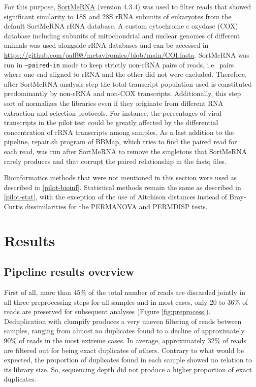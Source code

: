 \documentclass[
  openany]{book}
\begin{document}
For this purpose, \href{https://github.com/biocore/sortmerna}{SortMeRNA} \autocite{Kopylova2012} (version 4.3.4) was used to filter reads that showed significant similarity to 18S and 28S rRNA subunits of eukaryotes from the default SortMeRNA rRNA database. A custom cytochrome c oxydase (COX) database including subunits of mitochondrial and nuclear genomes of different animals was used alongside rRNA databases and can be accessed in \url{https://github.com/palf98/metaviromics/blob/main/COI.fasta}. SortMeRNA was run in \texttt{--paired-in} mode to keep strictly non-rRNA pairs of reads, i.e.~pairs where one end aligned to rRNA and the other did not were excluded. Therefore, after SortMeRNA analysis step the total transcript population used is constituted predominantly by non-rRNA and non-COX transcripts. Additionally, this step sort of normalizes the libraries even if they originate from different RNA extraction and selection protocols. For instance, the percentages of viral transcripts in the pilot test could be greatly affected by the differential concentration of rRNA transcripts among samples. As a last addition to the pipeline, repair.sh program of BBMap, which tries to find the paired read for each read, was run after SortMeRNA to remove the singletons that SortMeRNA rarely produces and that corrupt the paired relationship in the fastq files.

Bioinformatics methods that were not mentioned in this section were used as described in \ref{pilot-bioinf}. Statistical methods remain the same as described in \ref{pilot-stat}, with the exception of the use of Aitchison distances instead of Bray-Curtis dissimilarities for the PERMANOVA and PERMDISP tests.

\hypertarget{results-1}{%
\section{Results}\label{results-1}}

\hypertarget{pipeline-results-overview}{%
\subsection{Pipeline results overview}\label{pipeline-results-overview}}

First of all, more than \(45\%\) of the total number of reads are discarded jointly in all three preprocessing steps for all samples and in most cases, only 20 to \(36\%\) of reads are preserved for subsequent analyses (Figure \ref{fig:preprocess}). Deduplication with clumpify produces a very uneven filtering of reads between samples, ranging from almost no duplicates found to a decline of approximately \(90\%\) of reads in the most extreme cases. In average, approximately \(32\%\) of reads are filtered out for being exact duplicates of others. Contrary to what would be expected, the proportion of duplicates found in each sample showed no relation to its library size. So, sequencing depth did not produce a higher proportion of exact duplicates.
\end{document}
